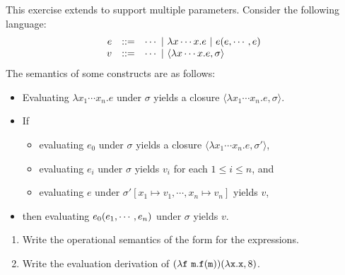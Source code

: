 \begin{exercise}

This exercise extends \Lang to support multiple parameters.
Consider the following language:
\[
\begin{array}{rrl}
  e & ::= & \cdots\ |\ \efun{x\cdots x}{e}\ |\ \eappfo{e}{e,\cdots,e}\\
  v & ::= & \cdots\ |\ \clov{x\cdots x}{e}{\sigma} \\
\end{array}
\]
The semantics of some constructs are as follows:
\begin{itemize}
  \item Evaluating $\lambda x_1\cdots x_n. e$ under $\sigma$
      yields a closure $\langle \lambda x_1\cdots x_n.e,\sigma \rangle$.
  \item If
    \begin{itemize}
    \item evaluating $e_0$ under $\sigma$ yields a closure $\langle \lambda x_1
      \cdots x_n.e,\sigma' \rangle$,
    \item evaluating $e_i$ under $\sigma$ yields $v_i$ for each $1 \leq i \leq
      n$, and
    \item evaluating $e$ under $\sigma'[x_1 \mapsto v_1, \cdots, x_n \mapsto
      v_n]$ yields $v$,
    \end{itemize}
\item[] then evaluating $e_0(e_1,\cdots,e_n)$ under $\sigma$ yields $v$.
\end{itemize}

\begin{enumerate}
  \item Write the operational semantics of the form  for the expressions.
  \item Write the evaluation derivation of
    $(\lambda\texttt{f}\
    \texttt{m}.\texttt{f}(\texttt{m}))(\lambda\texttt{x}.\texttt{x},8)$.
\end{enumerate}

\end{exercise}

